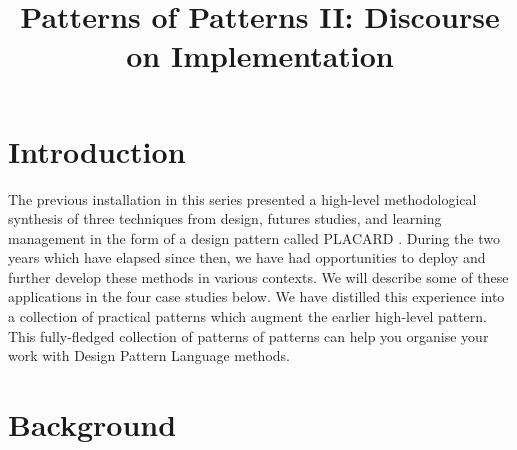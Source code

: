 \documentclass[acmlarge,timestamp]{acmart}
\date{}
\title{Patterns of Patterns II: Discourse on Implementation}
\begin{document}



\section{Introduction}
\label{sec:org195e8e3}
\label{Introduction}


The previous installation in this series presented a high-level
methodological synthesis of three techniques from design, futures
studies, and learning management in the form of a design pattern
called PLACARD \cite{patterns-of-patterns-i}.  During the two years
which have elapsed since then, we have had opportunities to deploy and
further develop these methods in various contexts.  We will describe
some of these applications in the four case studies below.  We have
distilled this experience into a collection of practical patterns
which augment the earlier high-level pattern.  This fully-fledged
collection of patterns of patterns can help you organise your work
with Design Pattern Language methods.



\section{Background}
\end{document}
